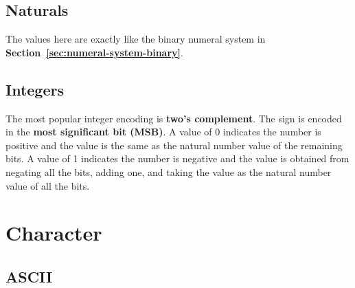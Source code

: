 \subsection{Naturals}

The values here are exactly like the binary numeral system in
\textbf{Section~\ref{sec:numeral-system-binary}}.

\subsection{Integers}

The most popular integer encoding is \textbf{two's complement}. The sign is
encoded in the \textbf{most significant bit (MSB)}. A value of 0 indicates the
number is positive and the value is the same as the natural number value of the
remaining bits. A value of 1 indicates the number is negative and the value is
obtained from negating all the bits, adding one, and taking the value as the
natural number value of all the bits.

\newpage
\section{Character}

\subsection{ASCII}

